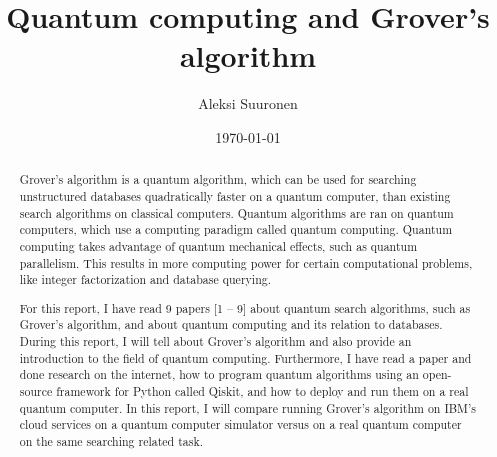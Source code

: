 \documentclass[english,oneside,openright]{UH_DS_report}
\title{Quantum computing and Grover's algorithm}
\author{Aleksi Suuronen}
\date{\today}
\begin{document}
\maketitle


\begin{abstract} 

Grover's algorithm is a quantum algorithm, which can be used for searching unstructured databases quadratically faster on a quantum computer, than existing search algorithms on classical computers. Quantum algorithms are ran on quantum computers, which use a computing paradigm called quantum computing. Quantum computing takes advantage of quantum mechanical effects, such as quantum parallelism. This results in more computing power for certain computational problems, like integer factorization and database querying.

For this report, I have read 9 papers [1 -- 9] about quantum search algorithms, such as Grover's algorithm, and about quantum computing and its relation to databases. During this report, I will tell about Grover's algorithm and also provide an introduction to the field of quantum computing. Furthermore, I have read a paper and done research on the internet, how to program quantum algorithms using an open-source framework for Python called Qiskit, and how to deploy and run them on a real quantum computer. In this report, I will compare running Grover's algorithm on IBM's cloud services on a quantum computer simulator versus on a real quantum computer on the same searching related task.

\end{abstract}

\mytableofcontents

\mynomenclature

\end{document}
